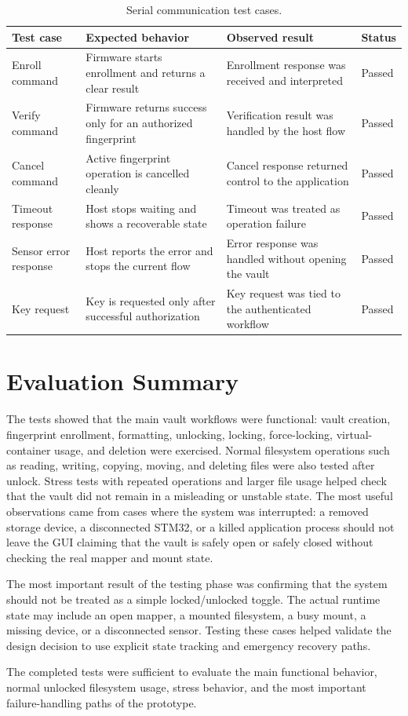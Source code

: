 \begin{table}[!htbp]
\centering
\caption{\label{tab:serial-tests}Serial communication test cases.}
\small
\begin{tabularx}{\textwidth}{lXXX}
\toprule
Test case & Expected behavior & Observed result & Status\\
\midrule
Enroll command & Firmware starts enrollment and returns a clear result & Enrollment response was received and interpreted & Passed\\
Verify command & Firmware returns success only for an authorized fingerprint & Verification result was handled by the host flow & Passed\\
Cancel command & Active fingerprint operation is cancelled cleanly & Cancel response returned control to the application & Passed\\
Timeout response & Host stops waiting and shows a recoverable state & Timeout was treated as operation failure & Passed\\
Sensor error response & Host reports the error and stops the current flow & Error response was handled without opening the vault & Passed\\
Key request & Key is requested only after successful authorization & Key request was tied to the authenticated workflow & Passed\\
\bottomrule
\end{tabularx}
\end{table}

\section{Evaluation Summary}

The tests showed that the main vault workflows were functional: vault creation, fingerprint enrollment, formatting, unlocking, locking, force-locking, virtual-container usage, and deletion were exercised. Normal filesystem operations such as reading, writing, copying, moving, and deleting files were also tested after unlock. Stress tests with repeated operations and larger file usage helped check that the vault did not remain in a misleading or unstable state. The most useful observations came from cases where the system was interrupted: a removed storage device, a disconnected STM32, or a killed application process should not leave the GUI claiming that the vault is safely open or safely closed without checking the real mapper and mount state.

The most important result of the testing phase was confirming that the system should not be treated as a simple locked/unlocked toggle. The actual runtime state may include an open mapper, a mounted filesystem, a busy mount, a missing device, or a disconnected sensor. Testing these cases helped validate the design decision to use explicit state tracking and emergency recovery paths.

The completed tests were sufficient to evaluate the main functional behavior, normal unlocked filesystem usage, stress behavior, and the most important failure-handling paths of the prototype.
